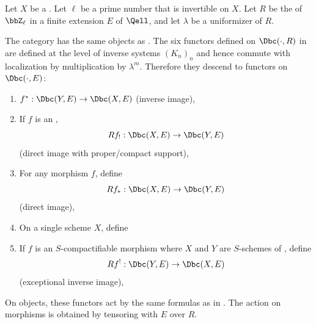 \begin{definition} \label{definition:six_functor_formalism_on_derived_category_of_bdd_constr_complexes_with_rational_coefficients_on_a_noetherian_scheme}
    Let $X$ be a . Let $\ell$ be a prime number that is invertible on $X$. Let $R$ be the  of $\bbZ_\ell$ in a finite extension $E$ of $\Qell$, and let $\lambda$ be a uniformizer of $R$.

    The category  has the same objects as . The six functors defined on $\Dbc(\cdot, R)$ in  are defined at the level of inverse systems $(K_n)_n$ and hence commute with localization by multiplication by $\lambda^m$. Therefore they descend to functors on $\Dbc(\cdot, E)$:
    \begin{enumerate}
        \item $f^*: \Dbc(Y,E) \to \Dbc(X,E)$ (inverse image),

        \item If $f$ is an ,
        $$Rf_!: \Dbc(X,E) \to \Dbc(Y,E)$$
        (direct image with proper/compact support),

        \item For any morphism $f$, define
        $$Rf_*: \Dbc(X,E) \to \Dbc(Y,E)$$
        (direct image),

        \item On a single scheme $X$, define


        \item If $f$ is an $S$-compactifiable morphism where $X$ and $Y$ are $S$-schemes of , define
        $$Rf^!: \Dbc(Y,E) \to \Dbc(X,E)$$
        (exceptional inverse image),

    \end{enumerate}
    On objects, these functors act by the same formulas as in . The action on morphisms is obtained by tensoring with $E$ over $R$.
\end{definition}
